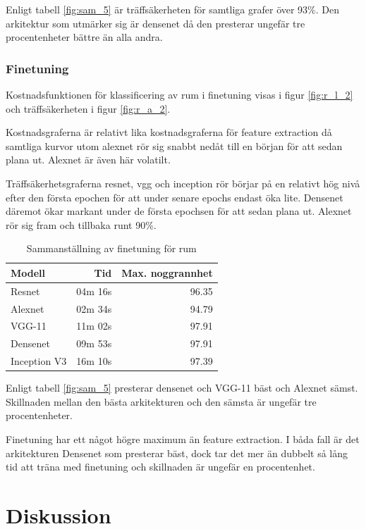 \documentclass[]{kththesis}
\begin{document}
Enligt tabell \ref{fig:sam_5} är träffsäkerheten för samtliga grafer över 93\%.
Den arkitektur som utmärker sig är densenet då den presterar ungefär tre procentenheter bättre än alla andra.

\subsection{Finetuning}
Kostnadsfunktionen för klassificering av rum i finetuning visas i figur \ref{fig:r_l_2} och träffsäkerheten i figur \ref{fig:r_a_2}.

Kostnadsgraferna är relativt lika kostnadsgraferna för feature extraction då samtliga kurvor utom alexnet rör sig snabbt nedåt till en början för att sedan plana ut.
Alexnet är även här volatilt.

Träffsäkerhetsgraferna resnet, vgg och inception rör börjar på en relativt hög nivå efter den första epochen för att under senare epochs endast öka lite.
Densenet däremot ökar markant under de första epochsen för att sedan plana ut. 
Alexnet rör sig fram och tillbaka runt 90\%. 

\begin{table}[!htbp]
  \centering
  \begin{tabular}{|l|r|r|}
    Modell & Tid & Max. noggrannhet \\ 
    \hline
    Resnet       & 04m 16s & 96.35 \\
    Alexnet      & 02m 34s & 94.79 \\
    VGG-11       & 11m 02s & 97.91 \\
    Densenet     & 09m 53s & 97.91 \\
    Inception V3 & 16m 10s & 97.39 \\
  \end{tabular}
  \caption{Sammanställning av finetuning för rum}
  \label{fig:sam_6}    
\end{table}

Enligt tabell \ref{fig:sam_5} presterar densenet och VGG-11 bäst och Alexnet sämst.
Skillnaden mellan den bästa arkitekturen och den sämsta är ungefär tre procentenheter.

Finetuning har ett något högre maximum än feature extraction.
I båda fall är det arkitekturen Densenet som presterar bäst, dock tar det mer än dubbelt så lång tid att träna med finetuning och skillnaden är ungefär en procentenhet.


\chapter{Diskussion}
\end{document}
